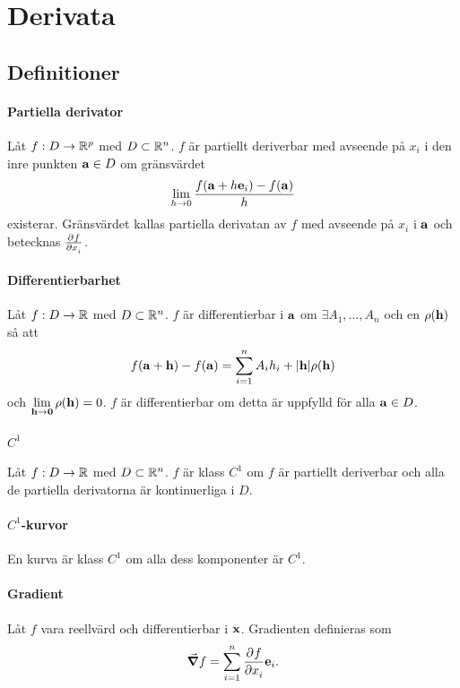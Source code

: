 \section{Derivata}

\subsection{Definitioner}

\paragraph{Partiella derivator}
Låt $f: D\to\mathbb{R}^p$ med $D\subset\mathbb{R}^n$. $f$ är partiellt deriverbar med avseende på $x_i$ i den inre punkten $\vect{a}\in D$ om gränsvärdet
\begin{align*}
	\limit{h}{0}\frac{f(\vect{a} + h\vect{e}_i) - f(\vect{a})}{h}
\end{align*}
existerar. Gränsvärdet kallas partiella derivatan av $f$ med avseende på $x_i$ i $\vect{a}$ och betecknas $\pdeval{f}{x_i}{\vect{a}}$.

\paragraph{Differentierbarhet}
Låt $f: D\to\mathbb{R}$ med $D\subset\mathbb{R}^n$. $f$ är differentierbar i $\vect{a}$ om $\exists A_1, \dots, A_n$ och en $\rho(\vect{h})$ så att
\begin{align*}
	f(\vect{a} + \vect{h}) - f(\vect{a}) = \sum\limits_{i = 1}^{n}A_ih_i + \abs{\vect{h}}\rho(\vect{h})
\end{align*}
och $\limit{\vect{h}}{\vect{0}}\rho(\vect{h}) = 0$. $f$ är differentierbar om detta är uppfylld för alla $\vect{a}\in D$.

\paragraph{$C^1$}
Låt $f: D\to\mathbb{R}$ med $D\subset\mathbb{R}^n$. $f$ är klass $C^1$ om $f$ är partiellt deriverbar och alla de partiella derivatorna är kontinuerliga i $D$.

\paragraph{$C^1$-kurvor}
En kurva är klass $C^1$ om alla dess komponenter är $C^1$.

\paragraph{Gradient}
Låt $f$ vara reellvärd och differentierbar i $\vect{x}$. Gradienten definieras som
\begin{align*}
	\grad{f} = \sum\limits_{i = 1}^{n}\pdeval{f}{x_i}{\vect{x}}\vect{e}_i.
\end{align*}

